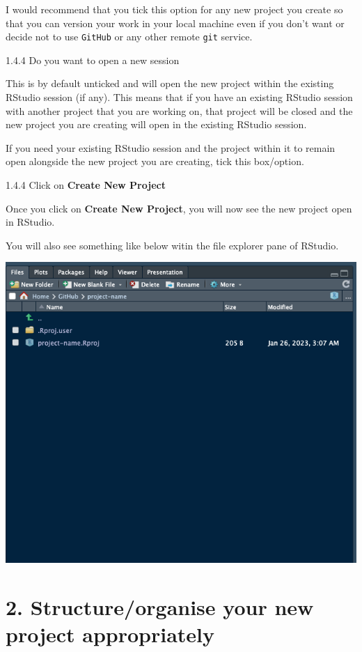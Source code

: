 \documentclass[
  12pt,
]{book}
\begin{document}
I would recommend that you tick this option for any new project you create so that you can version your work in your local machine even if you don't want or decide not to use \texttt{GitHub} or any other remote \texttt{git} service.

1.4.4 Do you want to open a new session

This is by default unticked and will open the new project within the existing RStudio session (if any). This means that if you have an existing RStudio session with another project that you are working on, that project will be closed and the new project you are creating will open in the existing RStudio session.

If you need your existing RStudio session and the project within it to remain open alongside the new project you are creating, tick this box/option.

1.4.4 Click on \textbf{Create New Project}

Once you click on \textbf{Create New Project}, you will now see the new project open in RStudio.

You will also see something like below witin the file explorer pane of RStudio.

\includegraphics{images/new_project6.png}

\hypertarget{structureorganise-your-new-project-appropriately}{%
\section{2. Structure/organise your new project appropriately}\label{structureorganise-your-new-project-appropriately}}
\end{document}

